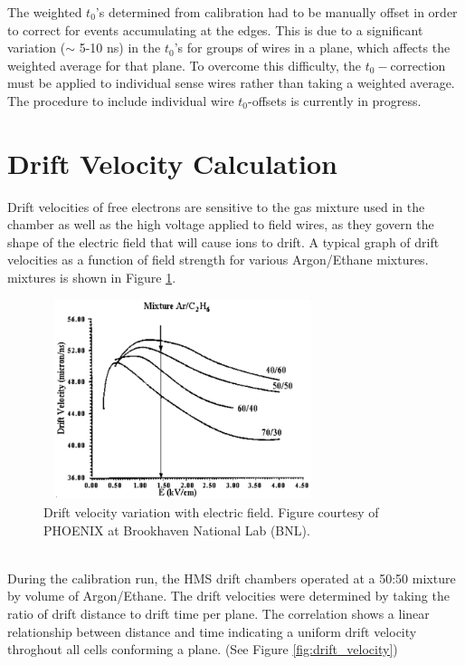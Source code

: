\documentclass[journal, a4paper]{IEEEtran}
\begin{document}
\indent The weighted $t_{0}$'s determined from calibration had to be manually offset in order to correct
for events accumulating at the edges. This is due to a significant variation ($\sim$ 5-10 ns) in the $t_{0}$'s for groups of wires
in a plane, which affects the weighted average for that plane. To overcome this difficulty, the $t_{0}-$correction
must be applied to individual sense wires rather than taking a weighted average. The procedure to include individual wire
$t_{0}$-offsets is currently in progress.
\section{Drift Velocity Calculation}
\noindent Drift velocities of free electrons are sensitive to the gas mixture used in
the chamber as well as the high voltage applied to field wires, as they govern the shape of the electric field that will cause ions to drift. A typical graph
of drift velocities as a function of field strength for various Argon/Ethane mixtures.
mixtures is shown in Figure \ref{fig:drift_vel_vs_Efield}.
\begin{figure}[!ht]
  \centering
  \includegraphics[width=3.2in, height=2.3in]{drift_vel_vs_Efield.png}
  \caption{Drift velocity variation with electric field. Figure courtesy of PHOENIX at Brookhaven National Lab (BNL).}
  \label{fig:drift_vel_vs_Efield}
\end{figure}\\
\indent During the calibration run, the HMS drift chambers operated at a 50:50 mixture by volume of Argon/Ethane. The drift velocities
were determined by taking the ratio of drift distance to drift time per plane. The correlation shows a linear relationship
between distance and time indicating a uniform drift velocity throghout all cells conforming a plane. (See Figure \ref{fig:drift_velocity})
\end{document}
